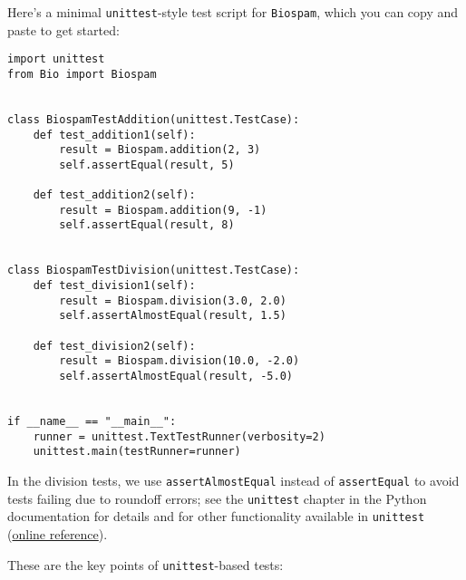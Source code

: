 Here's a minimal \verb|unittest|-style test script for \verb|Biospam|,
which you can copy and paste to get started:

\begin{verbatim}
import unittest
from Bio import Biospam


class BiospamTestAddition(unittest.TestCase):
    def test_addition1(self):
        result = Biospam.addition(2, 3)
        self.assertEqual(result, 5)

    def test_addition2(self):
        result = Biospam.addition(9, -1)
        self.assertEqual(result, 8)


class BiospamTestDivision(unittest.TestCase):
    def test_division1(self):
        result = Biospam.division(3.0, 2.0)
        self.assertAlmostEqual(result, 1.5)

    def test_division2(self):
        result = Biospam.division(10.0, -2.0)
        self.assertAlmostEqual(result, -5.0)


if __name__ == "__main__":
    runner = unittest.TextTestRunner(verbosity=2)
    unittest.main(testRunner=runner)
\end{verbatim}

In the division tests, we use \verb|assertAlmostEqual| instead of \verb|assertEqual| to avoid tests failing due to roundoff errors; see the \verb|unittest| chapter in the Python documentation for details and for other functionality available in \verb|unittest| (\href{https://docs.python.org/3/library/unittest.html}{online reference}).

These are the key points of \verb|unittest|-based tests:

